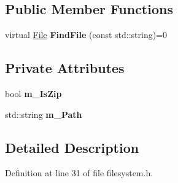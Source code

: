 \subsection*{Public Member Functions}
\begin{DoxyCompactItemize}
\item 
virtual \hyperlink{class_i_o_1_1_filesystem_1_1_file}{File} {\bfseries Find\+File} (const std\+::string)=0\hypertarget{class_i_o_1_1_filesystem_1_1_virtual_file_system_aa66db299cbd0cf9466a0b201d8f1b3f2}{}\label{class_i_o_1_1_filesystem_1_1_virtual_file_system_aa66db299cbd0cf9466a0b201d8f1b3f2}

\end{DoxyCompactItemize}
\subsection*{Private Attributes}
\begin{DoxyCompactItemize}
\item 
bool {\bfseries m\+\_\+\+Is\+Zip}\hypertarget{class_i_o_1_1_filesystem_1_1_virtual_file_system_a894b7f09be4ece2647b108d5b6b44b53}{}\label{class_i_o_1_1_filesystem_1_1_virtual_file_system_a894b7f09be4ece2647b108d5b6b44b53}

\item 
std\+::string {\bfseries m\+\_\+\+Path}\hypertarget{class_i_o_1_1_filesystem_1_1_virtual_file_system_a54e1b026f5f4473c743c1e13cb7dfb47}{}\label{class_i_o_1_1_filesystem_1_1_virtual_file_system_a54e1b026f5f4473c743c1e13cb7dfb47}

\end{DoxyCompactItemize}


\subsection{Detailed Description}


Definition at line 31 of file filesystem.\+h.

